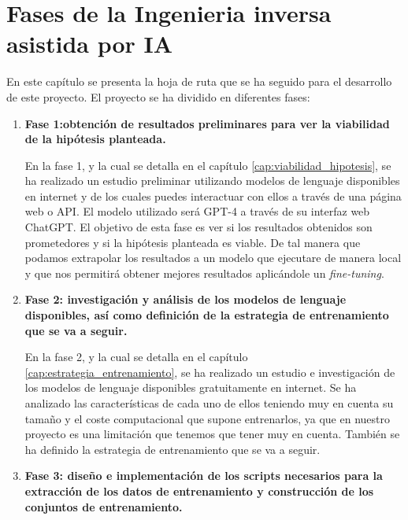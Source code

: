 \chapter{Fases de la Ingenieria inversa asistida por IA}
\label{cap:hoja_de_ruta}


En este capítulo se presenta la hoja de ruta que se ha seguido para el desarrollo de
este proyecto. El proyecto se ha dividido en diferentes fases:

\begin{enumerate}
    \item \textbf{Fase 1:obtención de resultados preliminares para ver la viabilidad 
        de la hipótesis planteada.} 

        En la fase 1, y la cual se detalla en el capítulo \ref{cap:viabilidad_hipotesis},
        se ha realizado un estudio preliminar utilizando modelos de lenguaje
        disponibles en internet y de los cuales puedes interactuar con ellos a través de
        una página web o API. El modelo utilizado será GPT-4 a través de su interfaz web
        ChatGPT. El objetivo de esta fase es ver si los resultados obtenidos son prometedores
        y si la hipótesis planteada es viable. De tal manera que podamos extrapolar los resultados
        a un modelo que ejecutare de manera local y que nos permitirá obtener mejores resultados
        aplicándole un \textit{fine-tuning}.

    \item \textbf{Fase 2: investigación y análisis de los modelos de lenguaje disponibles,
        así como definición de la estrategia de entrenamiento que se va a seguir.} 
        
        En la fase 2, y la cual se detalla en el capítulo \ref{cap:estrategia_entrenamiento},
        se ha realizado un estudio e investigación de los modelos de lenguaje disponibles
        gratuitamente en internet. Se ha analizado las características de cada uno de ellos
        teniendo muy en cuenta su tamaño y el coste computacional que supone entrenarlos, ya que
        en nuestro proyecto es una limitación que tenemos que tener muy en cuenta. También se ha
        definido la estrategia de entrenamiento que se va a seguir.

    \item \textbf{Fase 3: diseño e implementación de los scripts necesarios para la
        extracción de los datos de entrenamiento y construcción de los conjuntos de entrenamiento.} 
        

\end{enumerate}
